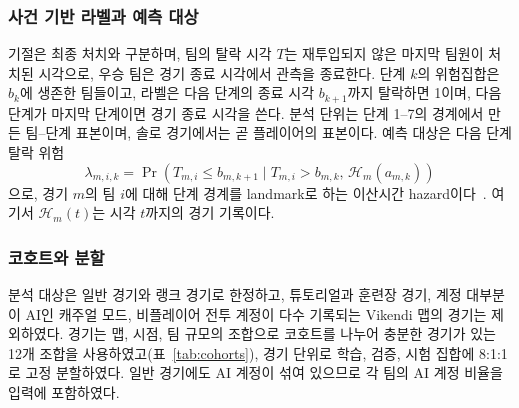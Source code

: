 \subsubsection{사건 기반 라벨과 예측 대상}
기절은 최종 처치와 구분하며, 팀의 탈락 시각 $T$는 재투입되지 않은 마지막 팀원이 처치된 시각으로, 우승 팀은 경기 종료 시각에서 관측을 종료한다.
단계 $k$의 위험집합은 $b_k$에 생존한 팀들이고, 라벨은 다음 단계의 종료 시각 $b_{k+1}$까지 탈락하면 1이며, 다음 단계가 마지막 단계이면 경기 종료 시각을 쓴다.
분석 단위는 단계 1--7의 경계에서 만든 팀--단계 표본이며, 솔로 경기에서는 곧 플레이어의 표본이다.
예측 대상은 다음 단계 탈락 위험
\begin{equation}
\lambda_{m,i,k}=\Pr\!\left(T_{m,i}\le b_{m,k+1} \mid T_{m,i}>b_{m,k},\,\mathcal{H}_{m}(a_{m,k})\right)
\label{eq:hazard}
\end{equation}
으로, 경기 $m$의 팀 $i$에 대해 단계 경계를 landmark로 하는 이산시간 hazard이다~\cite{SingerWillett93,vanHouwelingen07}. 여기서 $\mathcal{H}_{m}(t)$는 시각 $t$까지의 경기 기록이다.

\subsubsection{코호트와 분할}
\label{sec:method:cohort}
분석 대상은 일반 경기와 랭크 경기로 한정하고, 튜토리얼과 훈련장 경기, 계정 대부분이 AI인 캐주얼 모드, 비플레이어 전투 계정이 다수 기록되는 Vikendi 맵의 경기는 제외하였다.
경기는 맵, 시점, 팀 규모의 조합으로 코호트를 나누어 충분한 경기가 있는 12개 조합을 사용하였고(표~\ref{tab:cohorts}), 경기 단위로 학습, 검증, 시험 집합에 8:1:1로 고정 분할하였다.
일반 경기에도 AI 계정이 섞여 있으므로 각 팀의 AI 계정 비율을 입력에 포함하였다.

